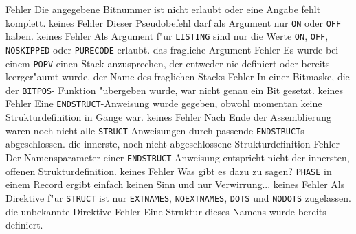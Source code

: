 \documentclass[12pt,a4paper,twoside]{report}
\newcommand{\tty}[1]{{\tt #1}}
\begin{document}
\begin{description}
               {Fehler}
               {Die angegebene Bitnummer ist nicht erlaubt
	        oder eine Angabe fehlt komplett.}
               {keines}
               {Fehler}
               {Dieser Pseudobefehl darf als Argument nur \tty{ON}
                oder \tty{OFF} haben.}
               {keines}
               {Fehler}
               {Als Argument f"ur \tty{LISTING} sind nur die Werte
                \tty{ON}, \tty{OFF}, \tty{NOSKIPPED} oder \tty{PURECODE}
                erlaubt.}
               {das fragliche Argument}
               {Fehler}
               {Es wurde bei einem \tty{POPV}
                einen Stack anzusprechen, der entweder nie definiert oder
                bereits leerger"aumt wurde.}
               {der Name des fraglichen Stacks}
	       {Fehler}
               {In einer Bitmaske, die der \tty{BITPOS}-
                Funktion "ubergeben wurde, war nicht genau ein Bit
                gesetzt.}
               {keines}
               {Fehler}
               {Eine \tty{ENDSTRUCT}-Anweisung wurde gegeben, obwohl
                momentan keine Strukturdefinition in Gange war.}
               {keines}
               {Fehler}
               {Nach Ende der Assemblierung waren noch nicht alle
                \tty{STRUCT}-Anweisungen durch passende \tty{ENDSTRUCT}s
                abgeschlossen.}
               {die innerste, noch nicht abgeschlossene
                Strukturdefinition}
               {Fehler}
               {Der Namensparameter einer \tty{ENDSTRUCT}-Anweisung
                entspricht nicht der innersten, offenen
                Strukturdefinition.}
               {keines}
               {Fehler}
               {Was gibt es dazu zu sagen?  \tty{PHASE} in einem Record
                ergibt einfach keinen Sinn und nur Verwirrung...}
               {keines}
\errentry{1554}{ung"ultige \tty{STRUCT}-Direktive}
               {Fehler}
               {Als Direktive f"ur \tty{STRUCT} ist nur
                \tty{EXTNAMES}, \tty{NOEXTNAMES}, \tty{DOTS} und
                \tty{NODOTS} zugelassen.}
               {die unbekannte Direktive}
               {Fehler}
               {Eine Struktur dieses Namens wurde bereits definiert.}

\end{description}
\end{document}
